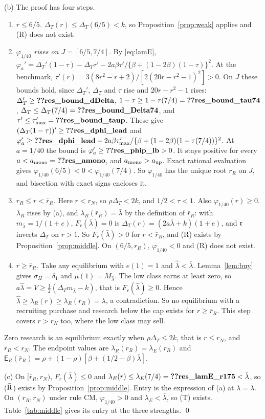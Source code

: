 \documentclass[12pt]{article}
\theoremstyle{definition}
\theoremstyle{remark}
\newcommand{\Ent}{\mathsf E}
\newcommand{\fr}{\mathfrak r}
\newcommand{\DT}{\Delta_T}
\newcommand{\lh}{\hat\lambda}
\newcommand{\lb}{\bar\lambda}
\begin{document}
(b) The proof has four steps.
\begin{enumerate}[nosep]
\item \emph{$r\le6/5$.} $\DT(r)\le\DT(6/5)<k$, so Proposition~\ref{prop:weak} applies and (R) does not exist.
\item \emph{$\varphi_{1/40}$ rises on $J=[6/5,7/4]$.} By \eqref{eq:lamE},
  $\varphi_a'=\DT'(1-\tau)-\DT\tau'-2a\beta\tau'/\{\beta+(1-2\beta)(1-\tau)\}^2$. At the benchmark,
  $\tau'(r)=3(8r^2-r+2)/[2(20r-r^2-1)^2]>0$. On $J$ these bounds hold, since $\DT'$, $\DT$ and $\tau$ rise
  and $20r-r^2-1$ rises:
  $\DT'\ge\reg{res_bound_dDelta}$, $1-\tau\ge1-\tau(7/4)=\reg{res_bound_tau74}$, $\DT\le\DT(7/4)=\reg{res_bound_Delta74}$,
  and $\tau'\le\tau'_{\max}=\reg{res_bound_taup}$. These give
  $(\DT(1-\tau))'\ge\reg{res_dphi_lead}$ and
  $\varphi_a'\ge\reg{res_dphi_lead}-2a\beta\tau'_{\max}/\{\beta+(1-2\beta)(1-\tau(7/4))\}^2$.
  At $a=1/40$ the bound is $\varphi_a'\ge\reg{res_phip_lb}>0$. It stays positive for every
  $a<a_{\rm mono}=\reg{res_amono}$, and $a_{\rm mono}>a_{\rm up}$. Exact rational evaluation gives
  $\varphi_{1/40}(6/5)<0<\varphi_{1/40}(7/4)$. So $\varphi_{1/40}$ has the unique root $r_R$ on $J$, and
  bisection with exact signs encloses it.
\item \emph{$r_R\le r<\bar r_R$.} Here $r<r_N$, so $\rho\DT<2k$, and $1/2<\tau<1$. Also $\varphi_{1/40}(r)\ge0$.
  $\lambda_R$ rises by (a), and $\lambda_R(\bar r_R)=\lb$ by the definition of $\bar r_R$: with $m_{\lb}=1/(1+e)$,
  $F_r(\lb)=0$ is $\DT(r)=(2a\lb+k)(1+e)$, and $\fr$ inverts $\DT$ on $r>1$. So $F_r(\lb)>0$ for $r<\bar r_R$, and (R)
  exists by Proposition~\ref{prop:middle}. On $(6/5,r_R)$, $\varphi_{1/40}<0$ and (R) does not exist.
\item \emph{$r\ge\bar r_R$.} Take any equilibrium with $e(1)=1$ and $\lh<\lb$. Lemma~\ref{lem:buy} gives
  $\sigma_H=\delta_1$ and $\mu(1)=M_{\lh}$. The low class earns at least zero, so
  $a\lh=V\ge\frac12(\DT m_{\lh}-k)$, that is $F_r(\lh)\ge0$. Hence $\lh\ge\lambda_R(r)\ge\lambda_R(\bar r_R)=\lb$, a
  contradiction. So no equilibrium with a recruiting purchase and research below the cap exists for $r\ge\bar r_R$. This step
  covers $r>r_N$ too, where the low class may sell.
\end{enumerate}
Zero research is an equilibrium exactly when $\rho\DT\le2k$, that is $r\le r_N$, and $\bar r_R<r_N$. The endpoint
values are $\lambda_R(r_R)=\lambda_E(r_R)$ and $\Ent_R(\bar r_R)=\rho+(1-\rho)[\beta+(1/2-\beta)\lb]$.

(c) On $[\bar r_R,r_N)$, $F_r(\lb)\le0$ and $\lambda_E(r)\le\lambda_E(7/4)=\reg{res_lamE_r175}<\lb$, so ($\bar{\rm R}$) exists by
Proposition~\ref{prop:middle}. Entry is the expression of (a) at $\lambda=\lb$. On $(r_R,r_N)$ under rule CM,
$\varphi_{1/40}>0$ and $\lambda_E<\lb$, so (T) exists. Table~\ref{tab:middle} gives its entry at the three
strengths. \qed
\end{document}
